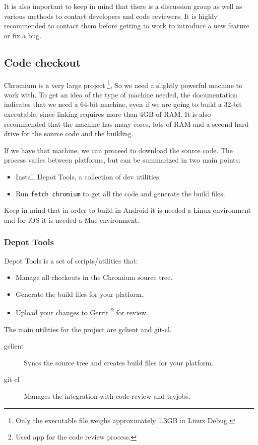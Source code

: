 It is also important to keep in mind that there is a discussion group as well as various methods to contact developers and code reviewers. It is highly recommended to contact them before getting to work to introduce a new feature or fix a bug.

\subsection{Code checkout}

Chromium is a very large project \footnote{Only the executable file weighs approximately 1.3GB in Linux Debug.}, So we need a slightly powerful machine to work with. To get an idea of the type of machine needed, the documentation indicates that we need a 64-bit machine, even if we are going to build a 32-bit executable, since linking requires more than 4GB of RAM. It is also recommended that the machine has many cores, lots of RAM and a second hard drive for the source code and the building.

If we have that machine, we can proceed to download the source code. The process varies between platforms, but can be summarized in two main points:
\begin{itemize}
    \item Install Depot Tools, a collection of dev utilities.
    \item Run \texttt{fetch chromium} to get all the code and generate the build files.
\end{itemize}

Keep in mind that in order to build in Android it is needed a Linux environment and for iOS it is needed a Mac environment.

\subsubsection{Depot Tools}

Depot Tools is a set of scripts/utilities that:
\begin{itemize}
    \item Manage all checkouts in the Chromium source tree.
    \item Generate the build files for your platform.
    \item Upload your changes to Gerrit \footnote{Used app for the code review process.} for review.
\end{itemize}

\noindent The main utilities for the project are gclient and git-cl.
\begin{description}
\item[gclient] Syncs the source tree and creates build files for your platform.
\item[git-cl] Manages the integration with code review and tryjobs.
\end{description}

